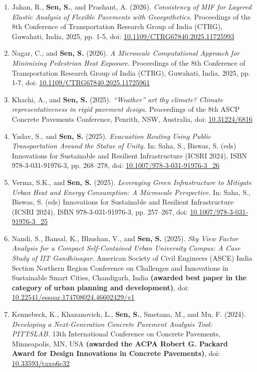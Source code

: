\documentclass[12pt]{article}
\begin{document}
\begin{enumerate}
	\item Jahan, R., \textbf{Sen, S.}, and Prashant, A. (2026). \textit{Consistency of MIF for Layered Elastic Analysis of Flexible Pavements with Geosynthetics.} Proceedings of the 8th Conference of Transportation Research Group of India (CTRG), Guwahati, India, 2025, pp. 1-5, doi: \href{https://doi.org/10.1109/CTRG67840.2025.11725993}{10.1109/CTRG67840.2025.11725993}
	\item Nagar, C., and \textbf{Sen, S.} (2026). \textit{A Microscale Computational Approach for Minimizing Pedestrian Heat Exposure.} Proceedings of the 8th Conference of Transportation Research Group of India (CTRG), Guwahati, India, 2025, pp. 1-7, doi: \href{https://doi.org/10.1109/CTRG67840.2025.11725961}{10.1109/CTRG67840.2025.11725961}
	\item Khachi, A., and \textbf{Sen, S.} (2025). \textit{ “Weather” art thy climate? Climate representativeness in rigid pavement design.} Proceedings of the 8th ASCP Concrete Pavements Conference, Penrith, NSW, Australia, doi: \href{https://doi.org/10.31224/6816}{10.31224/6816}
	\item Yadav, S., and \textbf{Sen, S.} (2025). \textit{Evacuation Routing Using Public Transportation Around the Statue of Unity.} In: Saha, S., Biswas, S. (eds) Innovations for Sustainable and Resilient Infrastructure (ICSRI 2024), ISBN 978-3-031-91976-3, pp. 268–278, doi: \href{https://doi.org/10.1007/978-3-031-91976-3\_26}{10.1007/978-3-031-91976-3\_26}
	\item Verma, S.K., and \textbf{Sen, S.} (2025). \textit{Leveraging Green Infrastructure to Mitigate Urban Heat and Energy Consumption: A Microscale Perspective.} In: Saha, S., Biswas, S. (eds) Innovations for Sustainable and Resilient Infrastructure (ICSRI 2024), ISBN 978-3-031-91976-3, pp. 257–267, doi: \href{https://doi.org/10.1007/978-3-031-91976-3\_25}{10.1007/978-3-031-91976-3\_25}
	\item Nandi, S., Bansal, K., Bhushan, V., and \textbf{Sen, S.} (2025). \textit{Sky View Factor Analysis for a Compact Self-Contained Urban University Campus: A Case Study of IIT Gandhinagar}. American Society of Civil Engineers (ASCE) India Section Northern Region Conference on Challenges and Innovations in Sustainable Smart Cities, Chandigarh, India \textbf{(awarded best paper in the category of urban planning and development)}, doi: \href{https://doi.org/10.22541/essoar.174708024.46602429/v1}{10.22541/essoar.174708024.46602429/v1}
	\item Kennebeck, K., Khazanovich, L., \textbf{Sen, S.}, Smetana, M., and Mu, F. (2024). \textit{Developing a Next-Generation Concrete Pavement Analysis Tool: PITTSLAB.} 13th International Conference on Concrete Pavements, Minneapolis, MN, USA \textbf{(awarded the ACPA Robert G. Packard Award for Design Innovations in Concrete Pavements)}, doi: \href{https://doi.org/10.33593/txxp6c32}{10.33593/txxp6c32}

\end{enumerate}
\end{document}
